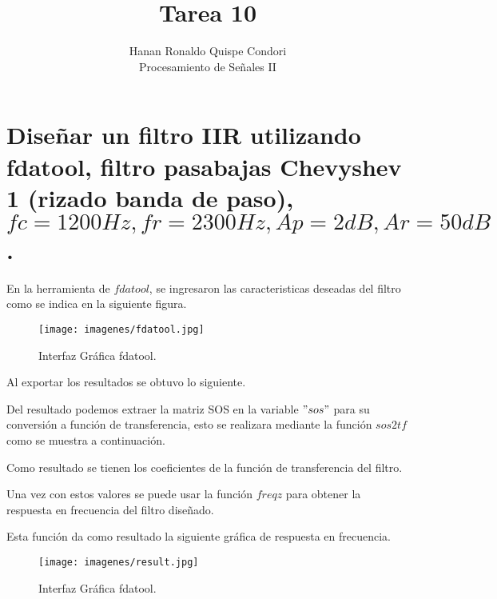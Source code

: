 \documentclass[12pt]{article}
\begin{document}
\title{Tarea 10}
\author{Hanan Ronaldo Quispe Condori\\ %
Procesamiento de Señales II}

\maketitle
\section{Diseñar un filtro IIR utilizando fdatool, filtro pasabajas Chevyshev 1 (rizado banda de paso), $fc=1200Hz,fr=2300Hz,Ap=2dB,Ar=50dB$.}

En la herramienta de $fdatool$, se ingresaron las caracteristicas deseadas del filtro como se indica en la siguiente figura.
\begin{figure}[h]
    \centering
    \texttt{[image: imagenes/fdatool.jpg]}
    \caption{Interfaz Gráfica fdatool.}
    \label{fig:fda}
\end{figure}

Al exportar los resultados se obtuvo lo siguiente.


Del resultado podemos extraer la matriz SOS en la variable $"sos"$ para su conversión a función de transferencia, esto se realizara mediante la función $sos2tf$  como se muestra a continuación.



Como resultado se tienen los coeficientes de la función de transferencia del filtro.



Una vez con estos valores se puede usar la función $freqz$ para obtener la respuesta en frecuencia del filtro diseñado.



Esta función da como resultado la siguiente gráfica de respuesta en frecuencia.

\begin{figure}[h]
    \centering
    \texttt{[image: imagenes/result.jpg]}
    \caption{Interfaz Gráfica fdatool.}
    \label{fig:fda}
\end{figure}
\end{document}
